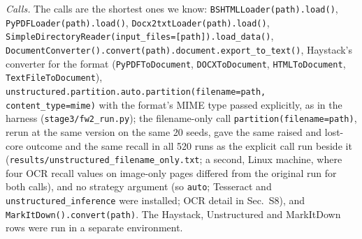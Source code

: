 \emph{Calls.} The calls are the shortest ones we know: \texttt{BSHTMLLoader(path).load()}, \texttt{PyPDFLoader(path).load()}, \texttt{Docx2txtLoader(path).load()}, \texttt{SimpleDirectoryReader(\allowbreak input\_files=[path])\allowbreak.load\_data()}, \texttt{DocumentConverter()\allowbreak.convert(path)\allowbreak.document\allowbreak.export\_to\_text()}, Haystack's converter for the format (\texttt{PyPDFToDocument}, \texttt{DOCXToDocument}, \texttt{HTMLToDocument}, \texttt{TextFileToDocument}), \texttt{unstructured.\allowbreak partition.\allowbreak auto.\allowbreak partition(\allowbreak filename=path, content\_type=mime)} with the format's MIME type passed explicitly, as in the harness (\texttt{stage3/fw2\_run.py}); the filename-only call \texttt{partition(filename=path)}, rerun at the same version on the same 20 seeds, gave the same raised and lost-core outcome and the same recall in all 520 runs as the explicit call run beside it (\texttt{results/unstructured\_filename\_only.txt}; a second, Linux machine, where four OCR recall values on image-only pages differed from the original run for both calls), and no strategy argument (so \texttt{auto}; Tesseract and \texttt{unstructured\_inference} were installed; OCR detail in Sec.~S8), and \texttt{MarkItDown().convert(path)}. The Haystack, Unstructured and MarkItDown rows were run in a separate environment.
